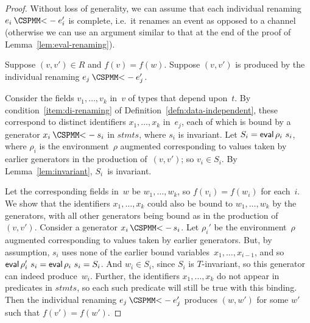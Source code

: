 
\begin{proof}
Without loss of generality, we can assume that each individual renaming
$e_i \lArrow e_i'$ is complete, i.e.~it renames an event as opposed to a
channel (otherwise we can use an argument similar to that at the end of the
proof of Lemma~\ref{lem:eval-renaming}).

Suppose $(v,v') \in R$ and $f(v) = f(w)$.  Suppose $(v,v')$ is produced by the
individual renaming $e_j \lArrow e_j'$.  

Consider the fields $v_1,\ldots,v_k$ in~$v$ of types that depend upon~$t$.  By
condition~\ref{item:di-renaming} of Definition~\ref{defn:data-independent},
these correspond to distinct identifiers $x_1,\ldots,x_k$ in~$e_j$, each of
which is bound by a generator $x_i \lArrow s_i$ in $stmts$, where $s_i$ is
invariant.  Let $S_i = \mathop{\sf eval} \rho_i~s_i$, where $\rho_i$ is the
environment~$\rho$ augmented corresponding to values taken by earlier
generators in the production of~$(v,v')$; so $v_i \in S_i$.  By
Lemma~\ref{lem:invariant}, $S_i$~is invariant.

Let the corresponding fields in~$w$ be $w_1,\ldots,w_k$, so $f(v_i) = f(w_i)$
for each~$i$.  We show that the identifiers $x_1,\ldots,x_k$ could also be
bound to $w_1,\ldots,w_k$ by the generators, with all other generators being
bound as in the production of~$(v,v')$.  
Consider a generator $x_i \,\M{<-}\, s_i$.  Let $\rho_i'$ be the
environment~$\rho$ augmented corresponding to values taken by earlier
generators.  But, by assumption, $s_i$ uses none of the earlier bound
variables~$x_1,\ldots,x_{i-1}$, and so $\mathop{\sf eval} \rho_i'~s_i = \mathop{\sf eval} \rho_i~s_i =
S_i$.   And $w_i \in S_i$, since $S_i$ is $T$-invariant, so this generator can
indeed produce~$w_i$.  Further, the identifiers $x_1,\ldots,x_k$ do not
appear in predicates in $stmts$, so each such predicate will still be true
with this binding.  Then  the individual renaming $e_j \lArrow e_j'$
produces $(w,w')$ for some $w'$ such that $f(v') = f(w')$.
\end{proof}


